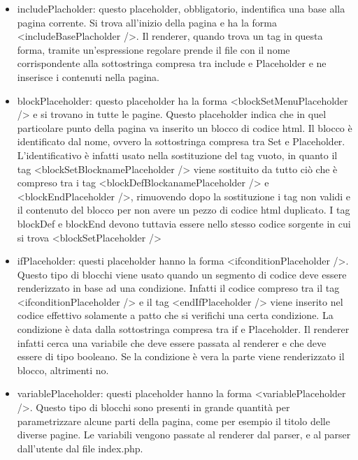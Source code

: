 \begin{itemize}
    
	\item includePlacholder: questo placeholder, obbligatorio, indentifica una base alla pagina corrente. Si trova all'inizio della pagina e ha la forma <includeBasePlacholder />. Il renderer, quando trova un tag in questa forma, tramite un'espressione
	regolare prende il file con il nome corrispondente alla sottostringa compresa tra include e Placeholder e ne inserisce i contenuti nella pagina.
	
    \item blockPlaceholder: questo placeholder ha la forma <blockSetMenuPlaceholder /> e si trovano in tutte le pagine. Questo placeholder indica che in quel particolare punto della pagina va inserito un blocco di codice html. Il blocco è identificato dal 
	nome, ovvero la sottostringa compresa tra Set e Placeholder. L'identificativo è infatti usato nella sostituzione del tag vuoto, in quanto il tag <blockSetBlocknamePlaceholder /> viene sostituito da tutto ciò che è compreso tra i tag <blockDefBlockanamePlaceholder /> 
	e <blockEndPlaceholder />, rimuovendo dopo la sostituzione i tag non validi e il contenuto del blocco per non avere un pezzo di codice html duplicato. I tag blockDef e blockEnd devono tuttavia essere nello stesso codice 
	sorgente in cui si trova <blockSetPlaceholder />
	
	\item ifPlaceholder: questi placeholder hanno la forma <ifconditionPlaceholder />. Questo tipo di blocchi viene usato quando un segmento di codice deve essere renderizzato in base ad una condizione. Infatti il codice compreso tra il tag <ifconditionPlaceholder /> 
	e il tag <endIfPlaceholder /> viene inserito nel codice effettivo solamente a patto che si verifichi una certa condizione. La condizione è data dalla sottostringa compresa tra if e Placeholder. Il renderer infatti cerca una variabile che deve essere passata
	al renderer e che deve essere di tipo booleano. Se la condizione è vera la parte viene renderizzato il blocco, altrimenti no.
	
	\item variablePlaceholder: questi placeholder hanno la forma <variablePlaceholder />. Questo tipo di blocchi sono presenti in grande quantità per parametrizzare alcune parti della pagina, come per esempio il titolo delle diverse pagine. Le variabili vengono 
	passate al renderer dal parser, e al parser dall'utente dal file index.php.
	
\end{itemize}

